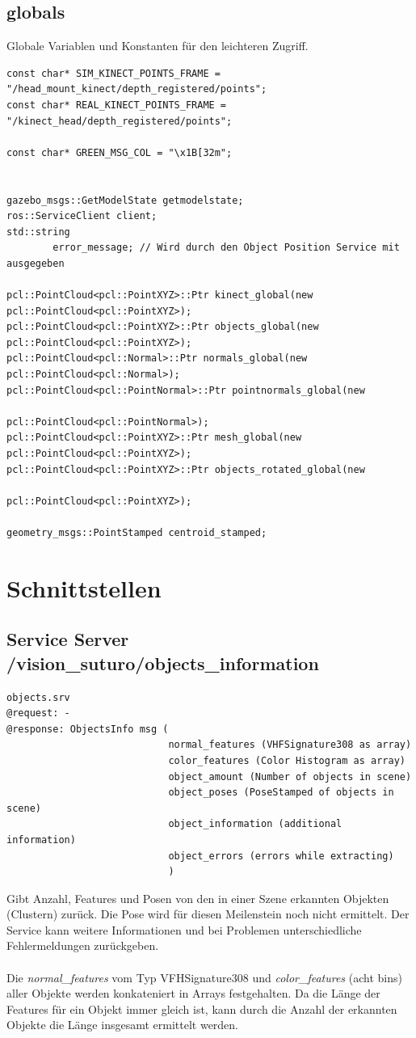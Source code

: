 \documentclass{suturo}
\begin{document}
\subsection{globals}
Globale Variablen und Konstanten für den leichteren Zugriff.

\begin{verbatim}
const char* SIM_KINECT_POINTS_FRAME = "/head_mount_kinect/depth_registered/points";
const char* REAL_KINECT_POINTS_FRAME = "/kinect_head/depth_registered/points";

const char* GREEN_MSG_COL = "\x1B[32m";


gazebo_msgs::GetModelState getmodelstate;
ros::ServiceClient client;
std::string
        error_message; // Wird durch den Object Position Service mit ausgegeben

pcl::PointCloud<pcl::PointXYZ>::Ptr kinect_global(new pcl::PointCloud<pcl::PointXYZ>);
pcl::PointCloud<pcl::PointXYZ>::Ptr objects_global(new pcl::PointCloud<pcl::PointXYZ>);
pcl::PointCloud<pcl::Normal>::Ptr normals_global(new pcl::PointCloud<pcl::Normal>);
pcl::PointCloud<pcl::PointNormal>::Ptr pointnormals_global(new
												pcl::PointCloud<pcl::PointNormal>);
pcl::PointCloud<pcl::PointXYZ>::Ptr mesh_global(new pcl::PointCloud<pcl::PointXYZ>);
pcl::PointCloud<pcl::PointXYZ>::Ptr objects_rotated_global(new 	
											 	pcl::PointCloud<pcl::PointXYZ>);

geometry_msgs::PointStamped centroid_stamped;
\end{verbatim}


\section*{Schnittstellen}

\subsection*{Service Server /vision\_suturo/objects\_information}
\begin{verbatim}
objects.srv
@request: -
@response: ObjectsInfo msg (
							normal_features (VHFSignature308 as array)
							color_features (Color Histogram as array)
							object_amount (Number of objects in scene)
							object_poses (PoseStamped of objects in scene)
							object_information (additional information)
							object_errors (errors while extracting)
							)
\end{verbatim}
Gibt Anzahl, Features und Posen von den in einer Szene erkannten Objekten (Clustern) zurück. Die Pose wird für diesen Meilenstein noch nicht ermittelt. Der Service kann weitere Informationen und bei Problemen unterschiedliche Fehlermeldungen zurückgeben.
\\ \\
Die \textit{normal\_features} vom Typ VFHSignature308 und \textit{color\_features} (acht bins) aller Objekte werden konkateniert in Arrays festgehalten. 
Da die Länge der Features für ein Objekt immer gleich ist, kann durch die Anzahl der erkannten Objekte die Länge insgesamt ermittelt werden.
\end{document}
